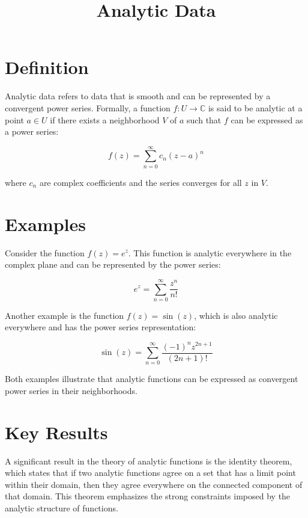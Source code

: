 \documentclass[11pt,a4paper]{article}
\title{Analytic Data}
\date{}
\begin{document}
\maketitle
\section{Definition}
Analytic data refers to data that is smooth and can be represented by a convergent power series. Formally, a function \( f: U \to \mathbb{C} \) is said to be analytic at a point \( a \in U \) if there exists a neighborhood \( V \) of \( a \) such that \( f \) can be expressed as a power series:

\begin{equation}
f(z) = \sum_{n=0}^{\infty} c_n (z - a)^n
\end{equation}

where \( c_n \) are complex coefficients and the series converges for all \( z \) in \( V \).

\section{Examples}
Consider the function \( f(z) = e^z \). This function is analytic everywhere in the complex plane and can be represented by the power series:

\begin{equation}
e^z = \sum_{n=0}^{\infty} \frac{z^n}{n!}
\end{equation}

Another example is the function \( f(z) = \sin(z) \), which is also analytic everywhere and has the power series representation:

\begin{equation}
\sin(z) = \sum_{n=0}^{\infty} \frac{(-1)^n z^{2n+1}}{(2n+1)!}
\end{equation}

Both examples illustrate that analytic functions can be expressed as convergent power series in their neighborhoods.

\section{Key Results}
A significant result in the theory of analytic functions is the identity theorem, which states that if two analytic functions agree on a set that has a limit point within their domain, then they agree everywhere on the connected component of that domain. This theorem emphasizes the strong constraints imposed by the analytic structure of functions.
\end{document}
